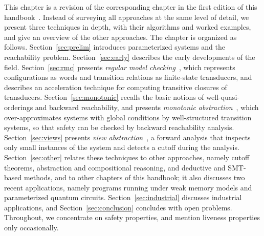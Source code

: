 This chapter is a revision of the corresponding chapter in the first edition
of this handbook~\cite{AST18}. Instead of surveying all approaches at the same
level of detail, we present three techniques in depth, with their algorithms
and worked examples, and give an overview of the other approaches. The chapter
is organized as follows. Section~\ref{sec:prelim} introduces parameterized
systems and the reachability problem. Section~\ref{sec:early}
describes the early developments of the field. Section~\ref{sec:rmc} presents
\emph{regular model checking}~\cite{KMMPS97,KW01,BJNT00}, which represents
configurations as words and transition relations as finite-state transducers,
and describes an acceleration technique for computing transitive closures of
transducers. Section~\ref{sec:monotonic} recalls the basic notions of
well-quasi-orderings and backward reachability, and presents \emph{monotonic
abstraction}~\cite{ADHR07}, which over-approximates systems with global
conditions by well-structured transition systems, so that safety can be checked
by backward reachability analysis. Section~\ref{sec:views} presents \emph{view
abstraction}~\cite{AHH13,AHH16}, a forward analysis that inspects only small
instances of the system and detects a cutoff during the analysis.
Section~\ref{sec:other} relates these techniques to other approaches, namely
cutoff theorems, abstraction and compositional reasoning, and deductive and
SMT-based methods, and to other chapters of this handbook; it also discusses
two recent applications, namely programs running under weak memory models and
parameterized quantum circuits. Section~\ref{sec:industrial} discusses
industrial applications, and Section~\ref{sec:conclusion} concludes with open
problems.
Throughout, we concentrate on safety properties, and mention liveness
properties only occasionally.
